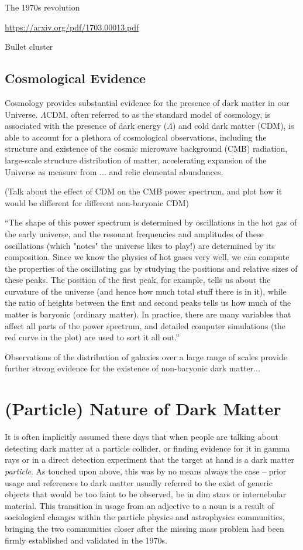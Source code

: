 The 1970s revolution

\url{https://arxiv.org/pdf/1703.00013.pdf}

Bullet cluster

\subsection{Cosmological Evidence}

Cosmology provides substantial evidence for the presence of dark matter in our Universe. $\Lambda$CDM, often referred to as the standard model of cosmology, is associated with the presence of dark energy ($\Lambda$) and cold dark matter (CDM), is able to account for a plethora of cosmological observations, including the structure and existence of the cosmic microwave background (CMB) radiation, large-scale structure distribution of matter, accelerating expansion of the Universe as measure from ... and relic elemental abundances.

(Talk about the effect of CDM on the CMB power spectrum, and plot how it would be different for different non-baryonic CDM)

``The shape of this power spectrum is determined by oscillations in the hot gas of the early universe, and the resonant frequencies and amplitudes of these oscillations (which "notes" the universe likes to play!) are determined by its composition. Since we know the physics of hot gases very well, we can compute the properties of the oscillating gas by studying the positions and relative sizes of these peaks. The position of the first peak, for example, tells us about the curvature of the universe (and hence how much total stuff there is in it), while the ratio of heights between the first and second peaks tells us how much of the matter is baryonic (ordinary matter). In practice, there are many variables that affect all parts of the power spectrum, and detailed computer simulations (the red curve in the plot) are used to sort it all out.''

Observations of the distribution of galaxies over a large range of scales provide further strong evidence for the existence of non-baryonic dark matter...

\section{(Particle) Nature of Dark Matter}

It is often implicitly assumed  these days that when people are talking about detecting dark matter at a particle collider, or finding evidence for it in gamma rays or in a direct detection experiment that the target at hand is a dark matter \emph{particle}. As touched upon above, this was by no means always the case -- prior usage and references to dark matter usually referred to the exist of generic objects that would be too faint to be observed, be in dim stars or internebular material. This transition in usage from an adjective to a noun is a result of sociological changes within the particle physics and astrophysics communities, bringing the two communities closer after the missing mass problem had been firmly established and validated in the 1970s. 

